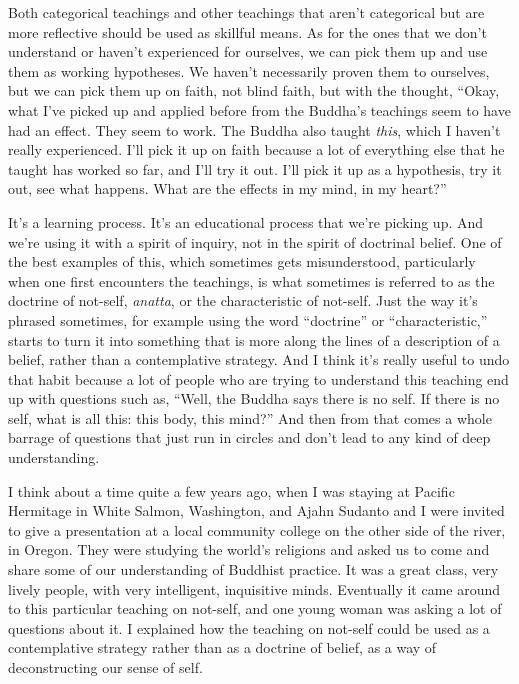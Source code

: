 Both categorical teachings and other teachings that aren't categorical but are more reflective should be used as skillful means. As for the ones that we don't understand or haven't experienced for ourselves, we can pick them up and use them as working hypotheses. We haven't necessarily proven them to ourselves, but we can pick them up on faith, not blind faith, but with the thought, ``Okay, what I've picked up and applied before from the Buddha's teachings seem to have had an effect. They seem to work. The Buddha also taught \emph{this}, which I haven't really experienced. I'll pick it up on faith because a lot of everything else that he taught has worked so far, and I'll try it out. I'll pick it up as a hypothesis, try it out, see what happens. What are the effects in my mind, in my heart?''

It's a learning process. It's an educational process that we're picking up. And we're using it with a spirit of inquiry, not in the spirit of doctrinal belief. One of the best examples of this, which sometimes gets misunderstood, particularly when one first encounters the teachings, is what sometimes is referred to as the doctrine of not-self, \emph{anatta}, or the characteristic of not-self. Just the way it's phrased sometimes, for example using the word ``doctrine'' or ``characteristic,'' starts to turn it into something that is more along the lines of a description of a belief, rather than a contemplative strategy. And I think it's really useful to undo that habit because a lot of people who are trying to understand this teaching end up with questions such as, ``Well, the Buddha says there is no self. If there is no self, what is all this: this body, this mind?'' And then from that comes a whole barrage of questions that just run in circles and don't lead to any kind of deep understanding.

I think about a time quite a few years ago, when I was staying at Pacific Hermitage in White Salmon, Washington, and Ajahn Sudanto and I were invited to give a presentation at a local community college on the other side of the river, in Oregon. They were studying the world's religions and asked us to come and share some of our understanding of Buddhist practice. It was a great class, very lively people, with very intelligent, inquisitive minds. Eventually it came around to this particular teaching on not-self, and one young woman was asking a lot of questions about it. I explained how the teaching on not-self could be used as a contemplative strategy rather than as a doctrine of belief, as a way of deconstructing our sense of self.

